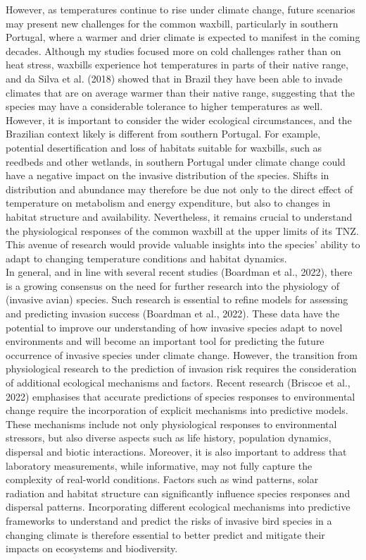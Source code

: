 \documentclass[10pt, twoside]{book} %
\begin{document}
However, as temperatures continue to rise under climate change, future scenarios may present new challenges for the common waxbill, particularly in southern Portugal, where a warmer and drier climate is expected to manifest in the coming decades.  Although my studies focused more on cold challenges rather than on heat stress, waxbills experience hot temperatures in parts of their native range, and da Silva et al. (2018) showed that in Brazil they have been able to invade climates that are on average warmer than their native range, suggesting that the species may have a considerable tolerance to higher temperatures as well. However, it is important to consider the wider ecological circumstances, and the Brazilian context likely is different from southern Portugal. For example, potential desertification and loss of habitats suitable for waxbills, such as reedbeds and other wetlands, in southern Portugal under climate change could have a negative impact on the invasive distribution of the species. Shifts in distribution and abundance may therefore be due not only to the direct effect of temperature on metabolism and energy expenditure,  but also to changes in habitat structure and availability. Nevertheless, it remains crucial to understand the physiological responses of the common waxbill at the upper limits of its TNZ. This avenue of research would provide valuable insights into the species' ability to adapt to changing temperature conditions and habitat dynamics.\\

In general, and in line with several recent studies (Boardman et al., 2022), there is a growing consensus on the need for further research into the physiology of (invasive avian) species. Such research is essential to refine models for assessing and predicting invasion success (Boardman et al., 2022). These data have the potential to improve our understanding of how invasive species adapt to novel environments and will become an important tool for predicting the future occurrence of invasive species under climate change. However, the transition from physiological research to the prediction of invasion risk requires the consideration of additional ecological mechanisms and factors. Recent research (Briscoe et al., 2022) emphasises that accurate predictions of species responses to environmental change require the incorporation of explicit mechanisms into predictive models. These mechanisms include not only physiological responses to environmental stressors, but also diverse aspects such as life history, population dynamics, dispersal and biotic interactions. Moreover, it is also important to address that laboratory measurements, while informative, may not fully capture the complexity of real-world conditions. Factors such as wind patterns, solar radiation and habitat structure can significantly influence species responses and dispersal patterns. Incorporating different ecological mechanisms into predictive frameworks to understand and predict the risks of invasive bird species in a changing climate is therefore essential to better predict and mitigate their impacts on ecosystems and biodiversity.\\
\end{document}
